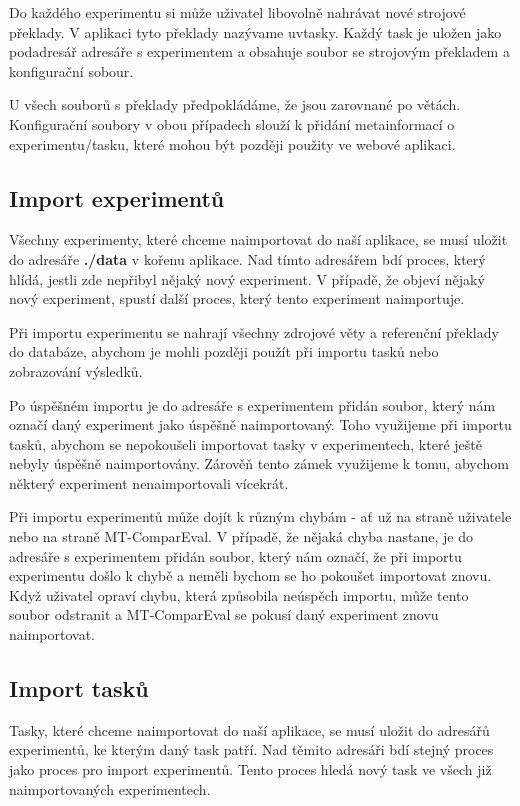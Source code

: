 Do každého experimentu si může uživatel libovolně nahrávat nové strojové překlady.
V aplikaci tyto překlady nazývame uv{tasky}.
Každý task je uložen jako podadresář adresáře s experimentem
  a obsahuje soubor se strojovým překladem
  a konfigurační sobour. 

U všech souborů s překlady předpokládáme, že jsou zarovnané po větách.
Konfigurační soubory v obou případech slouží k přidání metainformací o experimentu/tasku,
  které mohou být později použity ve webové aplikaci.

\subsection{Import experimentů}
Všechny experimenty, které chceme naimportovat do naší aplikace,
  se musí uložit do adresáře \textbf{./data} v kořenu aplikace.
Nad tímto adresářem bdí proces, který hlídá,
  jestli zde nepřibyl nějaký nový experiment.
V případě, že objeví nějaký nový experiment,
  spustí další proces, který tento experiment naimportuje.

Při importu experimentu se nahrají všechny zdrojové věty
  a referenční překlady do databáze,
  abychom je mohli později použít při importu tasků
  nebo zobrazování výsledků.

Po úspěšném importu je do adresáře s experimentem přidán soubor,
  který nám označí daný experiment jako úspěšně naimportovaný.
Toho využijeme při importu tasků,
  abychom se nepokoušeli importovat tasky v experimentech,
  které ještě nebyly úspěšně naimportovány.
Zárověň tento zámek využijeme k tomu,
  abychom některý experiment nenaimportovali vícekrát.

Při importu experimentů může dojít k různým chybám -
  ať už na straně uživatele nebo na straně MT-ComparEval.
V případě, že nějaká chyba nastane,
  je do adresáře s experimentem přidán soubor,
  který nám označí,
  že při importu experimentu došlo k chybě
  a neměli bychom se ho pokoušet importovat znovu.
Když uživatel opraví chybu,
  která způsobila neúspěch importu,
  může tento soubor odstranit
  a MT-ComparEval se pokusí daný experiment znovu naimportovat.

\subsection{Import tasků}
Tasky, které chceme naimportovat do naší aplikace,
  se musí uložit do adresářů experimentů,
  ke kterým daný task patří.
Nad těmito adresáři bdí stejný proces
  jako proces pro import experimentů.
Tento proces hledá nový task ve všech již 
  naimportovaných experimentech.

